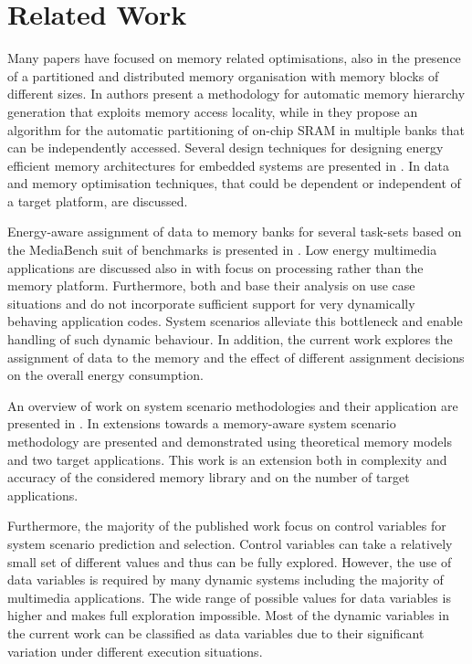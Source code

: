 \documentclass{acm_proc_article-sp}
\begin{document}
\section{Related Work}
\label{sec:related}

Many papers have focused on memory related optimisations, also in the presence of a partitioned and distributed memory organisation with memory blocks of different sizes. In \cite{Ben00b} authors present a methodology for automatic memory hierarchy generation that exploits memory access locality, while in \cite{Ben00c} they propose an algorithm for the automatic partitioning of on-chip SRAM in multiple banks that can be independently accessed. Several design techniques for designing energy efficient memory architectures for embedded systems are presented in \cite{Mac02}. In \cite{Pgk01} data and memory optimisation techniques, that could be dependent or independent of a target platform, are discussed. 

Energy-aware assignment of data to memory banks for several task-sets based on the MediaBench suit of benchmarks is presented in \cite{Mar03}. Low energy multimedia applications are discussed also in \cite{Chu02} with focus on processing rather than the memory platform. Furthermore, both \cite{Mar03} and \cite{Chu02} base their analysis on use case situations and do not incorporate sufficient support for very dynamically behaving application codes. System scenarios alleviate this bottleneck and enable handling of such dynamic behaviour. In addition, the current work explores the assignment of data to the memory and the effect of different assignment decisions on the overall energy consumption.

An overview of work on system scenario methodologies and their application are presented in \cite{Gheorghita2007}. In \cite{Fil12} extensions towards a memory-aware system scenario methodology are presented and demonstrated using theoretical memory models and two target applications. This work is an extension both in complexity and accuracy of the considered memory library and on the number of target applications. 

Furthermore, the majority of the published work focus on control variables for system scenario prediction and selection. Control variables can take a relatively small set of different values and thus can be fully explored. However, the use of data variables \cite{Elena2010} is required by many dynamic systems including the majority of multimedia applications. The wide range of possible values for data variables is higher and makes full exploration impossible. Most of the dynamic variables in the current work can be classified as data variables due to their significant variation under different execution situations. 
\end{document}

